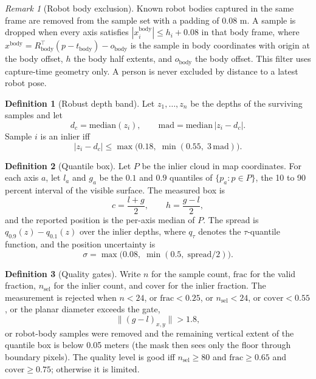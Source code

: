 \documentclass[10pt,a4paper]{article}
\theoremstyle{plain}
\theoremstyle{definition}
\newtheorem{definition}{Definition}[section]
\theoremstyle{remark}
\newtheorem{remark}{Remark}[section]
\begin{document}
\begin{remark}[Robot body exclusion]\label{rem:bodyexcl}
Known robot bodies captured in the same frame are removed from the sample set with a padding of 0.08 m. A sample is dropped when every axis satisfies $|x^{\mathrm{body}}_i| \le h_i + 0.08$ in that body frame, where $x^{\mathrm{body}} = R_{\mathrm{body}}^{\top}(p - t_{\mathrm{body}}) - o_{\mathrm{body}}$ is the sample in body coordinates with origin at the body offset, $h$ the body half extents, and $o_{\mathrm{body}}$ the body offset. This filter uses capture-time geometry only. A person is never excluded by distance to a latest robot pose.
\end{remark}

\begin{definition}[Robust depth band]\label{def:mad}
Let $z_1, \dots, z_n$ be the depths of the surviving samples and let
\begin{equation}
d_c = \mathrm{median}(z_i), \qquad
\mathrm{mad} = \mathrm{median}\,|z_i - d_c|.
\end{equation}
Sample $i$ is an inlier iff
\begin{equation}
|z_i - d_c| \le \max\bigl(0.18,\; \min(0.55,\; 3\,\mathrm{mad})\bigr).
\end{equation}
\end{definition}

\begin{definition}[Quantile box]\label{def:quantilebox}
Let $P$ be the inlier cloud in map coordinates. For each axis $a$, let $l_a$ and $g_a$ be the $0.1$ and $0.9$ quantiles of $\{p_a : p \in P\}$, the 10 to 90 percent interval of the visible surface. The measured box is
\begin{equation}
c = \frac{l + g}{2}, \qquad h = \frac{g - l}{2},
\end{equation}
and the reported position is the per-axis median of $P$. The spread is $q_{0.9}(z) - q_{0.1}(z)$ over the inlier depths, where $q_\tau$ denotes the $\tau$-quantile function, and the position uncertainty is
\begin{equation}
\sigma = \max\bigl(0.08,\; \min(0.5,\; \mathrm{spread}/2)\bigr).
\end{equation}
\end{definition}

\begin{definition}[Quality gates]\label{prop:gates}
Write $n$ for the sample count, $\mathrm{frac}$ for the valid fraction, $n_{\mathrm{sel}}$ for the inlier count, and $\mathrm{cover}$ for the inlier fraction. The measurement is rejected when $n < 24$, or $\mathrm{frac} < 0.25$, or $n_{\mathrm{sel}} < 24$, or $\mathrm{cover} < 0.55$, or the planar diameter exceeds the gate,
\begin{equation}
\|(g - l)_{x,y}\| > 1.8,
\end{equation}
or robot-body samples were removed and the remaining vertical extent of the quantile box is below 0.05 meters (the mask then sees only the floor through boundary pixels). The quality level is good iff $n_{\mathrm{sel}} \ge 80$ and $\mathrm{frac} \ge 0.65$ and $\mathrm{cover} \ge 0.75$; otherwise it is limited.
\end{definition}
\end{document}
